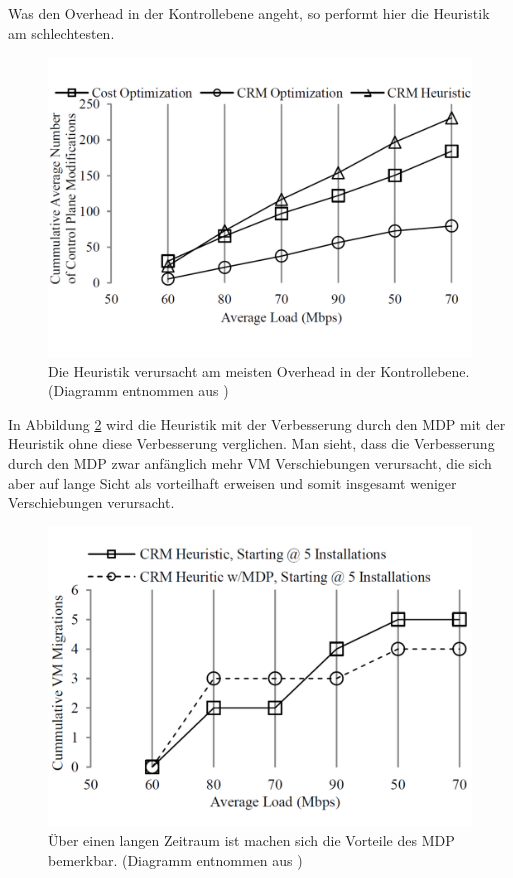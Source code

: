\documentclass[conference]{IEEEtran}
\begin{document}
Was den Overhead in der Kontrollebene angeht, so performt hier die Heuristik am schlechtesten. 

\begin{figure}[h!]
	\centering
	\includegraphics[trim=0 3cm 0 1cm,scale=0.25]{grafik/CPM.pdf}
	\caption{Die Heuristik verursacht am meisten Overhead in der Kontrollebene.
	(Diagramm entnommen aus \cite{IEEEhowto:orig})}
	\label{img:CPM}
\end{figure}


In Abbildung \ref{img:MDP} wird die Heuristik mit der Verbesserung durch den MDP mit der Heuristik ohne diese Verbesserung verglichen. Man sieht, dass die Verbesserung durch den MDP zwar anfänglich mehr VM Verschiebungen verursacht, die sich aber auf lange Sicht als vorteilhaft erweisen und somit insgesamt weniger Verschiebungen verursacht.

\begin{figure}[h!]
	\centering
	\includegraphics[trim=0 2cm 0 1cm,scale=0.25]{grafik/MDP.pdf}
	\caption{Über einen langen Zeitraum ist machen sich die Vorteile des MDP bemerkbar.
	(Diagramm entnommen aus \cite{IEEEhowto:orig})}
	\label{img:MDP}
\end{figure}
\end{document}
